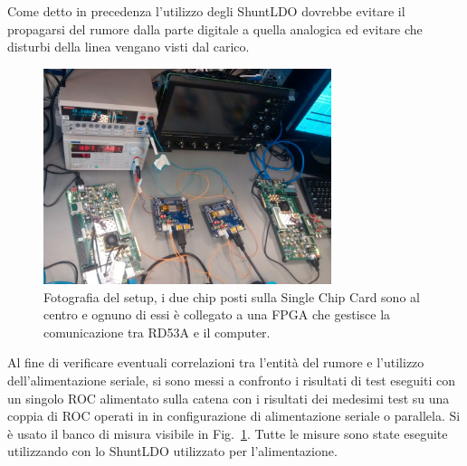Come detto in precedenza l'utilizzo degli ShuntLDO dovrebbe evitare il propagarsi del rumore dalla parte digitale a quella analogica ed evitare che disturbi della linea vengano visti dal carico. 
\begin{figure}
\centering
\includegraphics[width=0.75\textwidth]{Immagini/chipserial}
\caption{Fotografia del setup, i due chip posti sulla Single Chip Card sono al centro e ognuno di essi è collegato a una FPGA che gestisce la comunicazione tra RD53A e il computer.}
\label{chipserial}
\end{figure}
Al fine di verificare eventuali correlazioni tra l'entit\`a del rumore e l'utilizzo dell'alimentazione seriale, si sono messi a confronto i risultati di test eseguiti con un singolo ROC alimentato sulla catena con i risultati dei medesimi test su una coppia di ROC operati in in configurazione di alimentazione seriale o parallela. Si \`e usato il banco di misura visibile in Fig.~\ref{chipserial}. Tutte le misure sono state eseguite utilizzando con lo ShuntLDO utilizzato per l'alimentazione.

%
%

